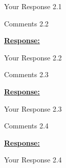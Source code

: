\documentclass{article}
\begin{document}
Your Response 2.1

\vspace{0.3cm}


\begin{cmt}{}{}

Comments 2.2

\end{cmt}
\vspace{0.1cm}
\noindent
\underline{\textbf{Response:}}
\vspace{0.2cm}

Your Response 2.2

\vspace{0.3cm}


\begin{cmt}{}{}

Comments 2.3

\end{cmt}
\vspace{0.1cm}
\noindent
\underline{\textbf{Response:}}
\vspace{0.2cm}

Your Response 2.3

\vspace{0.3cm}


\begin{cmt}{}{}

Comments 2.4

\end{cmt}
\vspace{0.1cm}
\noindent
\underline{\textbf{Response:}}
\vspace{0.2cm}

Your Response 2.4

\vspace{0.3cm}
\end{document}
